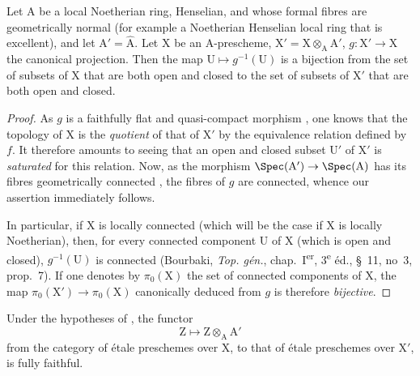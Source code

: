 \begin{corollary}[18.9.4]
\label{IV.18.9.4}
Let $\mathrm{A}$ be a local Noetherian ring, Henselian, and whose formal fibres are geometrically normal (for example a Noetherian Henselian local ring that is excellent), and let $\mathrm{A}'=\hat{\mathrm{A}}$.
Let $\mathrm{X}$ be an A-prescheme, $\mathrm{X}'=\mathrm{X}\otimes_{\mathrm{A}}\mathrm{A}'$, $g:\mathrm{X}'\to\mathrm{X}$ the canonical projection.
Then the map $\mathrm{U}\mapsto g^{-1}(\mathrm{U})$ is a bijection from the set of subsets of $\mathrm{X}$ that are both open and closed to the set of subsets of $\mathrm{X}'$ that are both open and closed.
\end{corollary}

\begin{proof}
As $g$ is a faithfully flat and quasi-compact morphism , one knows that the topology of X is the \emph{quotient} of that of $\mathrm{X}'$ by the equivalence relation defined by $f$.
It therefore amounts to seeing that an open and closed subset $\mathrm{U}'$ of $\mathrm{X}'$ is \emph{saturated} for this relation.
Now, as the morphism $\Spec(\mathrm{A}')\to\Spec(\mathrm{A})$ has its fibres geometrically connected , the fibres of $g$ are connected, whence our assertion immediately follows.

In particular, if X is locally connected (which will be the case if X is locally Noetherian), then, for every connected component U of X (which is open and closed), $g^{-1}(\mathrm{U})$ is connected (Bourbaki, \emph{Top. g\'{e}n.}, chap.~I\textsuperscript{er}, 3\textsuperscript{e} \'{e}d., \S~11, no~3, prop.~7).
If one denotes by $\pi_0(\mathrm{X})$ the set of connected components of X, the map $\pi_0(\mathrm{X}')\to\pi_0(\mathrm{X})$ canonically deduced from $g$ is therefore \emph{bijective}.
\end{proof}

\begin{corollary}[18.9.5]
\label{IV.18.9.5}
Under the hypotheses of , the functor
\begin{equation}
  \mathrm{Z}\mapsto\mathrm{Z}\otimes_{\mathrm{A}}\mathrm{A}'
  \tag{18.9.5.1}
\end{equation}
from the category of \'{e}tale preschemes over $\mathrm{X}$, to that of \'{e}tale preschemes over $\mathrm{X}'$, is fully faithful.
\end{corollary}

